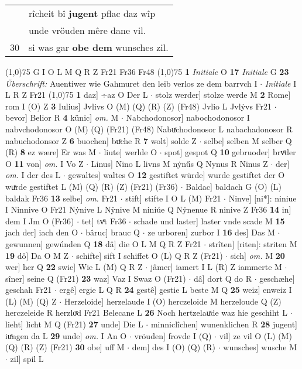 \documentclass[8pt,a4paper,notitlepage]{article}
\begin{document}
\begin{table}[ht]
\begin{minipage}[t]{0.5\linewidth}
\begin{tabular}{rl}
 & rîcheit bî \textbf{jugent} pflac daz wîp\\ 
 & unde vröuden mêre dane vil.\\ 
30 & si was gar \textbf{obe dem} wunsches zil.\\ 
\end{tabular}
\scriptsize
\line(1,0){75} \newline
G I O L M Q R Z Fr21 Fr36 Fr48 \newline
\line(1,0){75} \newline
\textbf{1} \textit{Initiale} O  \textbf{17} \textit{Initiale} G  \textbf{23} \textit{Überschrift:} Auentiwer wie Gahmuret den leib verlos ze dem barrvch I   $\cdot$ \textit{Initiale} I L R Z Fr21  \newline
\line(1,0){75} \newline
\textbf{1} daz] ÷az O Der L  $\cdot$ stolz werder] stolze werde M \textbf{2} Rome] rom I (O) Z \textbf{3} Iulius] Jvlivs O (M) (Q) (R) (Z) (Fr48) Jvlio L Jvlẏvs Fr21  $\cdot$ bevor] Belior R \textbf{4} künic] \textit{om.} M  $\cdot$ Nabchodonosor] nabochodonosor I nabvchodonosor O (M) (Q) (Fr21) (Fr48) Nabuͯchodonosor L nabachadonosor R nabuchodonsor Z \textbf{6} buochen] buͦche R \textbf{7} wolt] solde Z  $\cdot$ selbe] selben M selber Q (R) \textbf{8} ez wære] Er was M  $\cdot$ liute] werlde O  $\cdot$ spot] gespot Q \textbf{10} gebruoder] brvͦder O \textbf{11} von] \textit{om.} I Vo Z  $\cdot$ Linus] Nino L livns M nẏnűs Q Nynus R Ninus Z  $\cdot$ der] \textit{om.} I der des L  $\cdot$ gewaltes] waltes O \textbf{12} gestiftet würde] wurde gestiftet der O wuͯrde gestiftet L (M) (Q) (R) (Z) (Fr21) (Fr36)  $\cdot$ Baldac] baldach G (O) (L) baldak Fr36 \textbf{13} selbe] \textit{om.} Fr21  $\cdot$ stift] stifte I O L (M) Fr21  $\cdot$ Ninve] [ni*]: niniue I Ninnive O Fr21 Nẏnive L Nÿnive M niniúe Q Nẏnenue R ninive Z Fr36 \textbf{14} in] dem I Jm O (Fr36)  $\cdot$ tet] tvͦt Fr36  $\cdot$ schade und laster] laster vnde scade M \textbf{15} jach der] iach den O  $\cdot$ bâruc] brauc Q  $\cdot$ ze urboren] zurbor I \textbf{16} des] Das M  $\cdot$ gewunnen] gewúnden Q \textbf{18} dâ] die O L M Q R Z Fr21  $\cdot$ strîten] [riten]: striten M \textbf{19} dô] Da O M Z  $\cdot$ schifte] sift I schiffet O (L) Q R Z (Fr21)  $\cdot$ sich] \textit{om.} M \textbf{20} wer] her Q \textbf{22} swie] Wie L (M) Q R Z  $\cdot$ jâmer] iamert I L (R) Z iammerte M  $\cdot$ sîner] seine Q (Fr21) \textbf{23} waz] Vaz I Swaz O (Fr21)  $\cdot$ dâ] dort Q do R  $\cdot$ geschæhe] geschah Fr21  $\cdot$ ergê] ergie L Q R \textbf{24} gestê] gestie L beste M Q \textbf{25} weiz] enweiz I (L) (M) (Q) Z  $\cdot$ Herzeloide] herzelaude I (O) herczeloide M herzeloude Q (Z) herczeleide R herzloͮd Fr21 Belecane L \textbf{26} Noch hertzelauͯde waz hie geschiht L  $\cdot$ lieht] licht M Q (Fr21) \textbf{27} unde] Die L  $\cdot$ minniclîchen] wunenklichen R \textbf{28} jugent] iuͯngen da L \textbf{29} unde] \textit{om.} I An O  $\cdot$ vröuden] frovde I (Q)  $\cdot$ vil] ze vil O (L) (M) (Q) (R) (Z) (Fr21) \textbf{30} obe] uff M  $\cdot$ dem] des I (O) (Q) (R)  $\cdot$ wunsches] wusche M  $\cdot$ zil] spil L \newline

\end{minipage}
\end{table}
\end{document}
